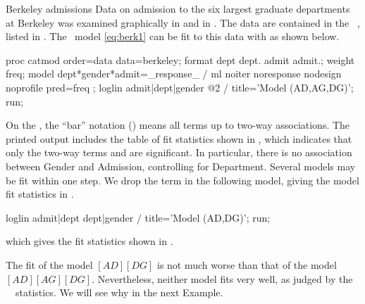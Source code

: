 \begin{Example}[berkeley5]{Berkeley admissions}
Data on admission to the six largest graduate departments at
Berkeley was examined graphically in 
and in .  The data are
contained in the \Dset\ , listed in
.
The \loglin\ model \eqref{eq:berk1} can be fit to this data
with  as shown below.

\begin{listing}
proc catmod order=data data=berkeley;
   format dept dept. admit admit.;
   weight freq;
   model dept*gender*admit=_response_ /
         ml noiter noresponse nodesign noprofile pred=freq ;
   loglin admit|dept|gender @2 / title='Model (AD,AG,DG)';
 run;
\end{listing}
On the , the ``bar'' notation () means all terms up to two-way associations.
The printed output includes the table of fit statistics shown in , which indicates that only
the two-way terms  and  are significant.  In
particular, there is no association between Gender and Admission,
controlling for Department.
Several models may be fit within one  step.
We drop the  term
in the following model, giving the model fit statistics in
.

\begin{listing}
   loglin admit|dept dept|gender / title='Model (AD,DG)';
 run;
\end{listing}
which gives the fit statistics shown in .

\begin{Output}[htb]
\caption{Berkeley admissions data: Model [AD] [AG] [DG], fit with }\label{out:catberk5.1}
\small

\end{Output}

\begin{Output}[htb]
\caption{Berkeley admissions data: Model [AD] [DG], fit with }\label{out:catberk5.2}
\small

\end{Output}

The fit of the model $[AD] [DG]$ is not much worse than that of the
model $[AD] [AG] [DG]$.
Nevertheless, neither model fits very well, as judged by the
\LR\ \GSQ\ statistics.
We will see why in the next Example.
\end{Example}
